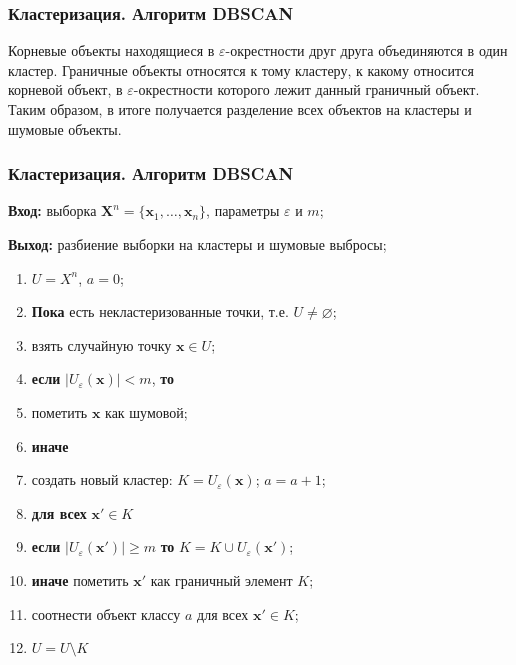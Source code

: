 \documentclass[notheorems, handout]{beamer}
\begin{document}
	\begin{frame}
	\frametitle{Кластеризация. Алгоритм DBSCAN}
	

	Корневые объекты находящиеся в $\varepsilon$-окрестности друг друга объединяются в один кластер. Граничные объекты относятся к тому кластеру, к какому относится корневой
	объект, в $\varepsilon$-окрестности которого лежит данный граничный объект. Таким образом, в итоге получается разделение всех объектов на кластеры и шумовые объекты.

	\end{frame}
	
	\begin{frame}
	\frametitle{Кластеризация. Алгоритм DBSCAN}
	

	\textbf{Вход:} выборка $\pmb X^{n} = \{\pmb x_1, \dots, \pmb x_{n}\}$, параметры $\varepsilon$ и $m$;
	
\textbf{Выход:} разбиение выборки на кластеры и шумовые выбросы;
\begin{enumerate}
		\item $U=X^n$, $a=0$; 
		\item \textbf{Пока} есть некластеризованные точки, т.е. $U \neq \varnothing$; 
		\item \quad взять случайную точку $\pmb x \in U$; 
		\item \quad \textbf{если} $|U_\varepsilon (\pmb x)| < m$, \textbf{то} 
		\item \quad \quad пометить $\pmb x$ как шумовой; 
		\item \quad \textbf{иначе} 
		\item \quad \quad создать новый кластер: $K=U_\varepsilon (\pmb x)$; $a = a + 1$; 
		\item \quad \quad \textbf{для всех} $\pmb x' \in K$ 
		\item \quad \quad \quad \textbf{если} $|U_\varepsilon (\pmb x')| \geq m$ \textbf{то} $K=K \cup U_\varepsilon(\pmb x')$; 
		\item \quad \quad \quad \textbf{иначе} пометить $\pmb x'$ как граничный элемент $K$; 
		\item \quad \quad соотнести объект классу $a$ для всех $\pmb x' \in K$; 
		\item \quad \quad $U=U \setminus K$ 
\end{enumerate}

	\end{frame}
	
\end{document}
